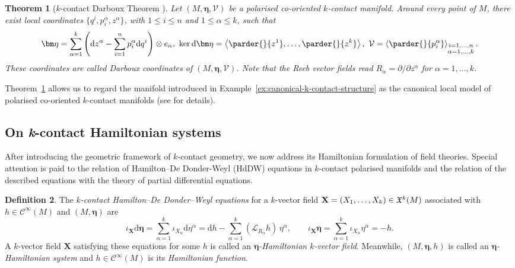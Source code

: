 \documentclass[11pt,a4paper]{article}
\newcommand{\dd}{\mathrm{d}}
\newcommand{\Lie}{\mathcal{L}}
\theoremstyle{plain} \newtheorem{theorem}{Theorem}[section] \newtheorem{proposition}[theorem]{Proposition} \newtheorem{corollary}[theorem]{Corollary} \newtheorem{lemma}[theorem]{Lemma} \theoremstyle{definition} \newtheorem{definition}[theorem]{Definition} \theoremstyle{remark} \newtheorem{remark}[theorem]{Remark} \newtheorem{example}[theorem]{Example} %
\newcommand{\Cinfty}{\mathscr{C}^\infty} \newcommand{\T}{\mathrm{T}} \newcommand{\cT}{\mathrm{T}^\ast} \newcommand{\Id}{\mathrm{Id}} \newcommand*{\inn}[1]{\iota_{#1}}
\begin{document}
\begin{theorem}[$k$-contact Darboux Theorem \cite{GGMRR_20}]
\label{thm:kcontDarboux}
Let $(M,\bm\eta,\mathcal{V})$ be a polarised co-oriented $k$-contact manifold. Around every point of $M$, there exist local coordinates $\{q^i,p_i^\alpha,z^\alpha\}$, with $1 \leq i \leq n$ and $1 \leq \alpha \leq k$, such that
\[
\bm \eta = \sum_{\alpha=1}^k \left(\dd z^\alpha - \sum_{i=1}^np_i^\alpha \dd q^i\right)\otimes e_\alpha,
\,\,
\ker \dd \bm\eta = \left\langle   \parder{}{z^1} ,\ldots,  \parder{}{z^k} \right\rangle,
 \,\,
\mathcal{V} = \left\langle \parder{}{p_i^\alpha} \right\rangle_{\substack{i=1,\ldots,n\\\alpha=1,\ldots,k}} .
\]
These coordinates are called \textit{Darboux coordinates} of $(M,\bm\eta,\mathcal{V})$. Note that the Reeb vector fields read $R_\alpha=\partial/\partial z^\alpha$ for $\alpha=1,\ldots,k$. 
\end{theorem}

Theorem~\ref{thm:kcontDarboux} allows us to regard the manifold introduced in Example~\ref{ex:canonical-k-contact-structure} as the canonical local model of polarised co-oriented $k$-contact manifolds (see \cite{LRS_25} for details). 


\subsection{On {\it k}-contact Hamiltonian systems}
\label{sub:k-contact-Hamiltonian-systems}

After introducing the geometric framework of $k$-contact geometry, we now address its Hamiltonian formulation of field theories. Special attention is paid to the relation of Hamilton--De Donder-Weyl (HdDW) equations in $k$-contact polarised manifolds and the relation of the described equations with the theory of partial differential equations.

\begin{definition}
The {\it $k$-contact Hamilton--De Donder--Weyl equations} for a $k$-vector field
${\bf X} = (X_1,\ldots,X_k) \in \mathfrak{X}^k(M)$ associated with $h\in \Cinfty(M)$ and $(M,\bm \eta)$ are
\begin{equation}\label{eq:k-contact-HdDW-fields1}
\iota_{\bm X}\dd\bm\eta=\sum_{\alpha=1}^k \inn{X_\alpha} \dd \eta^\alpha
= \dd h - \sum_{\alpha=1}^k (\Lie_{R_\alpha} h)\, \eta^\alpha,\qquad
\iota_{\bm X}\bm\eta=\sum_{\alpha=1}^k \inn{X_\alpha} \eta^\alpha
= -h .
\end{equation}
A $k$-vector field ${\bm X}$ satisfying these equations for some $h$ is called an
\textit{${\bm \eta}$-Hamiltonian $k$-vector field}. Meanwhile,  $(M,\bm \eta,h)$ is called an {\it $\bm\eta$-Hamiltonian system} and $h \in \Cinfty(M)$ is its \textit{Hamiltonian function}.
\end{definition}
\end{document}
